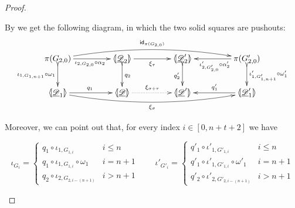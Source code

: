 \begin{proof}
\begin{itemize}
		By  we get the following diagram, in which the two solid squares are pushouts:
		\[\xymatrix@C=45pt{\pi(G_{2,0}) \ar@/^.4cm/[rrr]^{\id{\pi(G_{2,0})}}\ar@{>->}[d]_{\iota_{1, G_{1,n+1}} \circ \omega_1}\ar[r]_{\iota_{2, G_{2,0}} \circ \alpha_2}& \lpro \der{D}_2 \rpro \ar@{>->}[d]^{q_2}\ar[r]_{\xi_\tau} & \lpro \der{D}'_2 \rpro \ar@{>->}[d]_{q'_2} &\pi(G'_{2,0}) \ar@{>->}[d]^{\iota'_{1, G'_{1,n+1}} \circ \omega'_1} \ar[l]^{\iota'_{2, G'_{2,0}} \circ \alpha'_2}\\ \lpro \der{D}_1 \rpro \ar@/_.4cm/[rrr]_{\xi_\sigma} \ar[r]^{q_1} & \tpro{D} \ar@{.>}[r]^{\xi_{\sigma+\tau}} & \lpro \der{D}'\rpro & \lpro \der{D}'_1\rpro  \ar[l]_{q'_1}}\]
		
		Moreover, we can point out that, for every index $i\in [0,n+t+2]$ we have
		
		\[\iota_{G_i}=\begin{cases}q_1\circ \iota_{1, G_{1,i}} & i \leq n\\
			q_1\circ \iota_{1, G_{1, i}}\circ \omega_1& i=n+1\\
			q_2\circ \iota_{2, G_{2,i-(n+1)}} & i > n+1 
		\end{cases} \qquad \iota'_{G'_i}=\begin{cases}q'_1\circ \iota'_{1, G'_{1,i}} & i \leq n\\
			q'_1\circ \iota'_{1, G'_{1, i}}\circ \omega'_1& i=n+1\\
			q'_2\circ \iota'_{2, G'_{2,i-(n+1)}} & i > n+1 
		\end{cases}\]
		

\end{itemize}
\end{proof}

